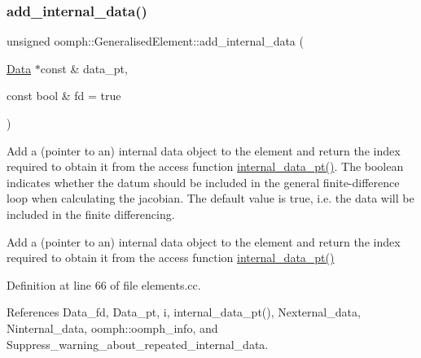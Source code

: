 \mbox{\label{classoomph_1_1GeneralisedElement_a36571ae9c4b6d2a26c36004e5be88389}} 
\subsubsection{\texorpdfstring{add\+\_\+internal\+\_\+data()}{add\_internal\_data()}}
{\footnotesize\ttfamily unsigned oomph\+::\+Generalised\+Element\+::add\+\_\+internal\+\_\+data (\begin{DoxyParamCaption}\item[{\hyperlink{classoomph_1_1Data}{Data} $\ast$const \&}]{data\+\_\+pt,  }\item[{const bool \&}]{fd = {\ttfamily true} }\end{DoxyParamCaption})\hspace{0.3cm}{\ttfamily [protected]}}



Add a (pointer to an) internal data object to the element and return the index required to obtain it from the access function {\ttfamily \hyperlink{classoomph_1_1GeneralisedElement_a45e32d895d4b3686e0f15fe455f4ed44}{internal\+\_\+data\+\_\+pt()}}. The boolean indicates whether the datum should be included in the general finite-\/difference loop when calculating the jacobian. The default value is true, i.\+e. the data will be included in the finite differencing. 

Add a (pointer to an) internal data object to the element and return the index required to obtain it from the access function {\ttfamily \hyperlink{classoomph_1_1GeneralisedElement_a45e32d895d4b3686e0f15fe455f4ed44}{internal\+\_\+data\+\_\+pt()}} 

Definition at line 66 of file elements.\+cc.



References Data\+\_\+fd, Data\+\_\+pt, i, internal\+\_\+data\+\_\+pt(), Nexternal\+\_\+data, Ninternal\+\_\+data, oomph\+::oomph\+\_\+info, and Suppress\+\_\+warning\+\_\+about\+\_\+repeated\+\_\+internal\+\_\+data.



